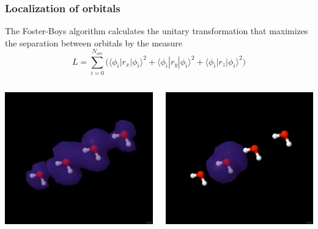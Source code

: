 \documentclass[mathserif]{beamer}
\begin{document}
\begin{frame}
    \frametitle{Localization of orbitals}
    The Foster-Boys algorithm calculates the unitary transformation
    that maximizes the separation between orbitals by the measure
    \begin{equation}
	\nonumber
	L = \sum_{i=0}^{N_{occ}} \Big(
		\langle\phi_i|r_x|\phi_i\rangle^2 + 
		\langle\phi_i|r_y|\phi_i\rangle^2 + 
		\langle\phi_i|r_z|\phi_i\rangle^2 \Big)
    \end{equation}
    \begin{columns}
    \begin{column}{.48\textwidth}
	\begin{center}
	\includegraphics[bb = 60 150 820 670, clip, scale=0.2]{figures/canonical.pdf}
	\end{center}
    \end{column}
    \begin{column}{.48\textwidth}
	\begin{center}
	\includegraphics[bb = 60 150 820 670, clip, scale=0.2]{figures/localized.pdf}

\end{center}
\end{column}
\end{columns}
\end{frame}
\end{document}
